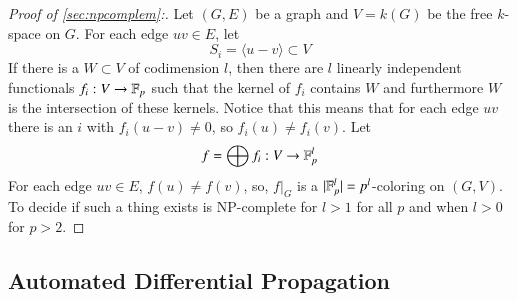 \begin{proof}[Proof of \ref{sec:npcomplem}:]
  Let $(G,E)$ be a graph and $V=k(G)$ be the free $k$-space on $G$.
  For each edge $uv\in E$, let 
  \[S_i=\langle u-v\rangle\subset V\]
  If there is a $W\subset V$ of codimension $l$, then there are $l$ linearly independent functionals $f_i:V\to \mathbb{F}_p$ such that the kernel of $f_i$ contains $W$ and furthermore $W$ is the intersection of these kernels.
  Notice that this means that for each edge $uv$ there is an $i$ with $f_i(u-v)\ne 0$, so $f_i(u)\ne f_i(v)$.
  Let
  \[f=\bigoplus f_i : V \to \mathbb{F}_p^l\]
  For each edge $uv\in E$, $f(u)\ne f(v)$, so, $f|_{G}$ is a $|\mathbb{F}_p^l|=p^l$-coloring on $(G,V)$.
  To decide if such a thing exists is NP-complete for $l>1$ for all $p$ and when $l>0$ for $p>2$.
\end{proof}
  

\subsection{Automated Differential Propagation}

